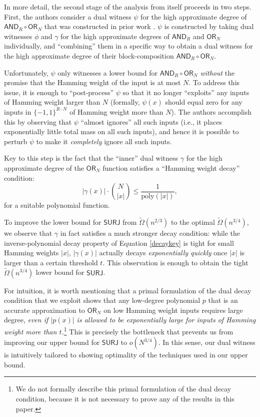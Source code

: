 \documentclass[11pt, letterpaper, fleqn]{article}
\theoremstyle{plain}
\newcommand{\poly}{\mathrm{poly}}
\newcommand{\SURJ}{\mathsf{ SURJ}}
\newcommand{\OR}{\mathsf{ OR}}
\newcommand{\bits}{\{-1,1\}}
\newcommand{\AND}{\mathsf{AND}}
\begin{document}
\label{s:overviewoftheproofs}




In more detail, the second stage of the analysis from \cite{adegsurj} itself proceeds in two steps. First, the authors consider a dual witness $\psi$ for the high approximate degree of $\AND_R \circ \OR_N$ that was constructed in prior work \cite{bt13}. $\psi$ is constructed by taking dual witnesses $\phi$ and $\gamma$ for the high approximate degrees of $\AND_R$ and $\OR_N$ individually, and ``combining'' them in a specific
way \cite{shizhu, sherstovhalfspaces1, lee} to obtain a dual witness for the high approximate degree of their block-composition $\AND_R \circ \OR_N$. 

 Unfortunately, $\psi$ only  witnesses a lower bound for $\AND_R \circ \OR_N$ \emph{without} the promise that the Hamming weight of the input is at most $N$. To address this issue, it is enough to ``post-process'' $\psi$ so that it no longer ``exploits''
any inputs of Hamming weight larger than $N$ (formally, $\psi(x)$ should equal zero
for any inputs in $\bits^{R \cdot N}$ of Hamming weight more than $N$). The authors accomplish this
by observing that $\psi$ ``almost ignores'' all such inputs (i.e., it places exponentially little total mass on all such inputs), and hence it is possible
to perturb $\psi$ to make it \emph{completely} ignore all such inputs.

Key to this step is the fact that the ``inner'' dual witness $\gamma$ for the high approximate degree of the $\OR_N$ function satisfies a ``Hamming weight decay'' condition:
\begin{equation} \label{decaykey} |\gamma(x)| \cdot \binom{N}{|x|}\leq \frac{1}{\poly(|x|)},\end{equation} for a suitable polynomial function. 

To improve the lower bound for $\SURJ$ from $\tilde{\Omega}(n^{2/3})$ 
to the optimal $\tilde{\Omega}(n^{3/4})$, we observe that $\gamma$ in fact
satisfies a much stronger decay condition: while the inverse-polynomial decay property of Equation \eqref{decaykey} is tight for small Hamming weights $|x|$, $|\gamma(x)|$ actually
decays \emph{exponentially quickly} once $|x|$ is larger than a certain threshold $t$. 
This observation is enough to obtain the tight $\tilde{\Omega}(n^{3/4})$ lower bound for $\SURJ$. 

For intuition, it is worth mentioning that a primal formulation of the dual decay condition that we exploit shows that any low-degree polynomial $p$ that is an accurate
approximation to $\OR_N$ on low Hamming weight inputs requires large degree,
\emph{even if $|p(x)|$ is allowed to be exponentially large for inputs of Hamming weight
more than $t$.}\footnote{We do not formally describe this primal formulation of the dual decay condition, because it is not necessary to prove any of the results in this paper.} This is precisely the bottleneck that prevents us from improving our
upper bound for $\SURJ$ to $o(N^{3/4})$. In this sense, our dual witness
is intuitively tailored to showing optimality of the techniques used in our upper bound.
\end{document}
